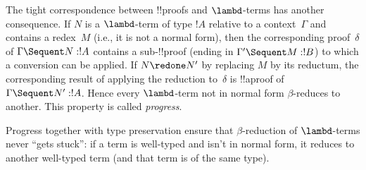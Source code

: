 \documentclass[../../../include/open-logic-section]{subfiles}
\begin{document}
The tight correspondence between !!{proof}s and $\lambd$-terms has
another consequence. If $N$ is a $\lambd$-term of type $!A$ relative
to a context~$\Gamma$ and contains a redex~$M$ (i.e., it is not a
normal form), then the corresponding  proof~$\delta$ of
$\Gamma \Sequent N : !A$ contains a sub-!!{proof} (ending in $\Gamma'
\Sequent M: !B$) to which a conversion can be applied. If $N \redone
N'$ by replacing $M$ by its reductum, the corresponding result of
applying the reduction to~$\delta$ is !!a{proof} of $\Gamma \Sequent
N' : !A$. Hence every $\lambd$-term not in normal form $\beta$-reduces
to another. This property is called \emph{progress}.

Progress together with type preservation ensure that $\beta$-reduction
of $\lambd$-terms never ``gets stuck'': if a term is well-typed and
isn't in normal form, it reduces to another well-typed term (and that
term is of the same type).
\end{document}
